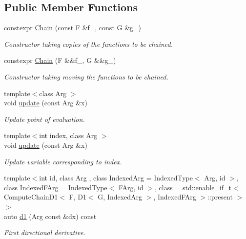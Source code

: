 \subsection*{Public Member Functions}
\begin{DoxyCompactItemize}
\item 
constexpr \hyperlink{structFunG_1_1MathematicalOperations_1_1Chain_aea55b97629df71369488750410e0c66d}{Chain} (const F \&f\+\_\+, const G \&g\+\_\+)
\begin{DoxyCompactList}\small\item\em Constructor taking copies of the functions to be chained. \end{DoxyCompactList}\item 
constexpr \hyperlink{structFunG_1_1MathematicalOperations_1_1Chain_a4323e75022efde2e066df2ef11010b21}{Chain} (F \&\&f\+\_\+, G \&\&g\+\_\+)
\begin{DoxyCompactList}\small\item\em Constructor taking moving the functions to be chained. \end{DoxyCompactList}\item 
{\footnotesize template$<$class Arg $>$ }\\void \hyperlink{structFunG_1_1MathematicalOperations_1_1Chain_adb7f63859ef7dbdd08b0908c3a17794d}{update} (const Arg \&x)
\begin{DoxyCompactList}\small\item\em Update point of evaluation. \end{DoxyCompactList}\item 
{\footnotesize template$<$int index, class Arg $>$ }\\void \hyperlink{structFunG_1_1MathematicalOperations_1_1Chain_aa41d754e68072e0a9f1460da79f9913e}{update} (const Arg \&x)
\begin{DoxyCompactList}\small\item\em Update variable corresponding to index. \end{DoxyCompactList}\item 
{\footnotesize template$<$int id, class Arg , class Indexed\+Arg  = Indexed\+Type$<$ Arg, id $>$, class Indexed\+F\+Arg  = Indexed\+Type$<$ F\+Arg, id $>$, class  = std\+::enable\+\_\+if\+\_\+t$<$                           Compute\+Chain\+D1$<$ F, D1$<$ G, Indexed\+Arg $>$, Indexed\+F\+Arg $>$\+::present $>$$>$ }\\auto \hyperlink{structFunG_1_1MathematicalOperations_1_1Chain_adfe741dee89257258b39df846fd16cf7}{d1} (Arg const \&dx) const 
\begin{DoxyCompactList}\small\item\em First directional derivative. \end{DoxyCompactList}\item 

\end{DoxyCompactItemize}
